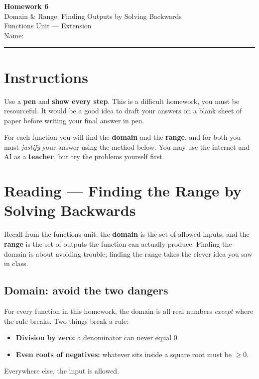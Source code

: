 \documentclass[12pt]{article}
\begin{document}
\pagestyle{fancy}
\begin{center}
  {\Large\bfseries Homework 6}\\[4pt]
  Domain \& Range: Finding Outputs by Solving Backwards\\[4pt]
  {\small Functions Unit --- Extension}\\[6pt]
  Name:\;\underline{\hspace{6.5cm}}\quad
\end{center}
\hrule\bigskip

\section*{Instructions}
Use a \textbf{pen} and \textbf{show every step}. This is a difficult homework, you must be resourceful. It would be a good idea to draft your answers on a blank sheet of paper before writing your final answer in pen. 

For each function you will find the \textbf{domain} and the
\textbf{range}, and for both you must \emph{justify} your answer using the method below. You may use the internet and AI as a
\textbf{teacher}, but try the problems yourself first. 


\section*{Reading --- Finding the Range by Solving Backwards}
Recall from the functions unit: the \textbf{domain} is the set of allowed inputs, and the \textbf{range} is the
set of outputs the function can actually produce. Finding the domain is about avoiding trouble; finding the range
takes the clever idea you saw in class.

\subsection*{Domain: avoid the two dangers}
For every function in this homework, the domain is all real numbers \emph{except} where the rule breaks. Two
things break a rule:
\begin{itemize}
  \item \textbf{Division by zero:} a denominator can never equal $0$.
  \item \textbf{Even roots of negatives:} whatever sits inside a square root must be $\ge 0$.
\end{itemize}
Everywhere else, the input is allowed.
\end{document}
